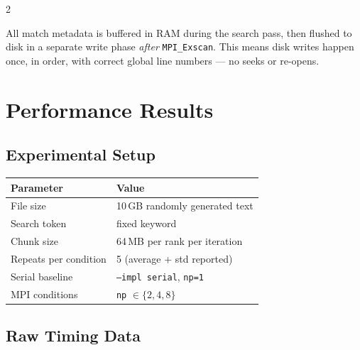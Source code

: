 \documentclass[11pt,a4paper]{article}
\begin{document}
\begin{multicols}{2}
\vspace{0.3cm}

\begin{tcolorbox}[trick={Trick 5 — Deferred write / compute-write overlap}]
All match metadata is buffered in RAM during the search pass, then flushed to disk in a separate write phase \emph{after} \texttt{MPI\_Exscan}. This means disk writes happen once, in order, with correct global line numbers — no seeks or re-opens.
\end{tcolorbox}

\end{multicols}

\newpage
\section{Performance Results}

\subsection{Experimental Setup}

\begin{center}
\begin{tabular}{ll}
\toprule
\textbf{Parameter} & \textbf{Value} \\
\midrule
File size & 10\,GB randomly generated text \\
Search token & fixed keyword \\
Chunk size & 64\,MB per rank per iteration \\
Repeats per condition & 5 (average + std reported) \\
Serial baseline & \texttt{--impl serial}, \texttt{np=1} \\
MPI conditions & \texttt{np} $\in \{2,4,8\}$ \\
\bottomrule
\end{tabular}
\end{center}

\vspace{0.4cm}
\subsection{Raw Timing Data}
\end{document}
